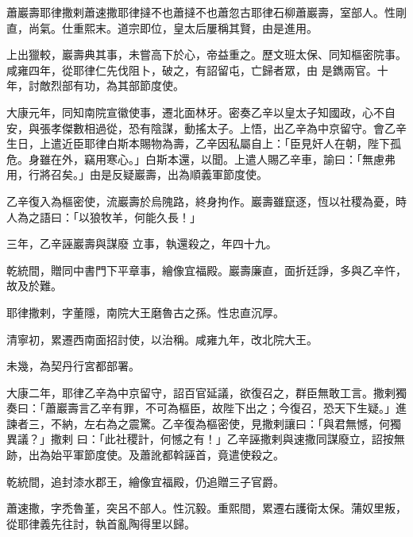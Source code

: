 
\begin{pinyinscope}

 蕭巖壽耶律撒剌蕭速撒耶律撻不也蕭撻不也蕭忽古耶律石柳蕭巖壽，室部人。性剛直，尚氣。仕重熙末。道宗即位，皇太后屢稱其賢，由是進用。



 上出獵較，巖壽典其事，未嘗高下於心，帝益重之。歷文班太保、同知樞密院事。咸雍四年，從耶律仁先伐阻卜，破之，有詔留屯，亡歸者眾，由
 是鐫兩官。十年，討敵烈部有功，為其部節度使。



 大康元年，同知南院宣徽使事，遷北面林牙。密奏乙辛以皇太子知國政，心不自安，與張孝傑數相過從，恐有陰謀，動搖太子。上悟，出乙辛為中京留守。會乙辛生日，上遣近臣耶律白斯本賜物為壽，乙辛因私屬自上：「臣見奸人在朝，陛下孤危。身雖在外，竊用寒心。」白斯本還，以聞。上遣人賜乙辛車，諭曰：「無慮弗用，行將召矣。」由是反疑巖壽，出為順義軍節度使。



 乙辛復入為樞密使，流巖壽於烏隗路，終身拘作。巖壽雖竄逐，恆以社稷為憂，時人為之語曰：「以狼牧羊，何能久長！」



 三年，乙辛誣巖壽與謀廢
 立事，執還殺之，年四十九。



 乾統間，贈同中書門下平章事，繪像宜福殿。巖壽廉直，面折廷諍，多與乙辛忤，故及於難。



 耶律撒剌，字董隱，南院大王磨魯古之孫。性忠直沉厚。



 清寧初，累遷西南面招討使，以治稱。咸雍九年，改北院大王。



 未幾，為契丹行宮都部署。



 大康二年，耶律乙辛為中京留守，詔百官延議，欲復召之，群臣無敢工言。撒剌獨奏曰：「蕭巖壽言乙辛有罪，不可為樞臣，故陛下出之；今復召，恐天下生疑。」進諫者三，不納，左右為之震驚。乙辛復為樞密使，見撒剌讓曰：「與君無憾，何獨異議？」撒剌
 曰：「此社稷計，何憾之有！」乙辛誣撒剌與速撒同謀廢立，詔按無跡，出為始平軍節度使。及蕭訛都斡誣首，竟遣使殺之。



 乾統間，追封漆水郡王，繪像宜福殿，仍追贈三子官爵。



 蕭速撒，字禿魯堇，突呂不部人。性沉毅。重熙間，累遷右護衛太保。蒲奴里叛，從耶律義先往討，執首亂陶得里以歸。




\end{pinyinscope}
